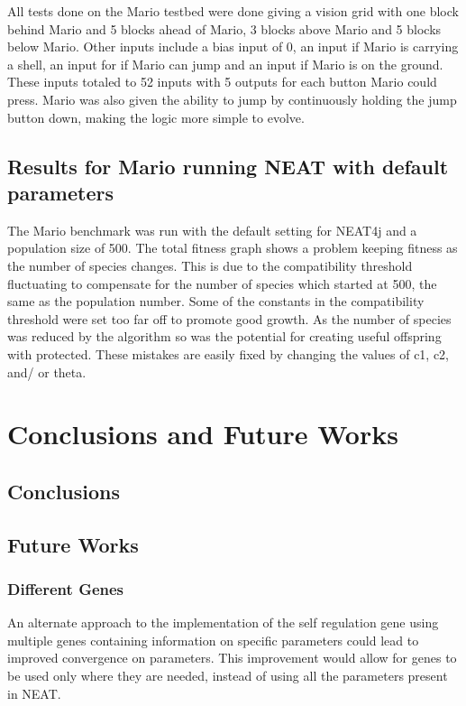 \documentclass[12pt]{ucthesis} \newif\ifpdf \ifx\pdfoutput\undefined
\begin{document}
All tests done on the Mario testbed were done giving a vision grid with one
block behind Mario and 5 blocks ahead of Mario, 3 blocks above Mario and 5
blocks below Mario. Other inputs include a bias input of 0, an input if Mario is
carrying a shell, an input for if Mario can jump and an input if Mario is on the
ground. These inputs totaled to 52 inputs with 5 outputs for each button Mario
could press. Mario was also given the ability to jump by continuously holding
the jump button down, making the logic more simple to evolve.

\section{Results for Mario running NEAT with default parameters}
The Mario benchmark was run with the default setting for NEAT4j and a population
size of 500. The total fitness graph shows a problem keeping fitness as the
number of species changes. This is due to the compatibility threshold
fluctuating to compensate for the number of species which started at 500, the
same as the population number. Some of the constants in the compatibility
threshold were set too far off to promote good growth. As the number of species
was reduced by the algorithm so was the potential for creating useful offspring
with protected. These mistakes are easily fixed by changing the values of c1,
c2, and/ or theta.

\chapter{Conclusions and Future Works}
\section{Conclusions}

\section{Future Works}

\subsection{Different Genes}

An alternate approach to the implementation of the self regulation gene using
multiple genes containing information on specific parameters could lead to
improved convergence on parameters. This improvement would allow for genes to be
used only where they are needed, instead of using all the parameters present in
NEAT.
\end{document}
